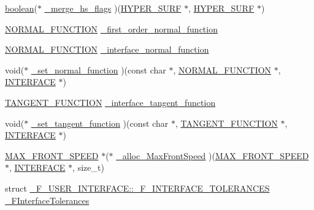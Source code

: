 \begin{DoxyCompactItemize}
\item 
\hyperlink{cdecs_8h_ad048433382a936258fb49e2ec4f148e1}{boolean}($\ast$ \hyperlink{struct___f___u_s_e_r___i_n_t_e_r_f_a_c_e_ab08945a66d48df7977c6a1df5259df87}{\+\_\+merge\+\_\+hs\+\_\+flags} )(\hyperlink{int_8h_acef50fa4757ce0d3f75c97fab5a175bc}{H\+Y\+P\+E\+R\+\_\+\+S\+U\+RF} $\ast$, \hyperlink{int_8h_acef50fa4757ce0d3f75c97fab5a175bc}{H\+Y\+P\+E\+R\+\_\+\+S\+U\+RF} $\ast$)
\item 
\hyperlink{fuserint_8h_a3e3bd260955ac448c42e60e8db22ab36}{N\+O\+R\+M\+A\+L\+\_\+\+F\+U\+N\+C\+T\+I\+ON} \hyperlink{struct___f___u_s_e_r___i_n_t_e_r_f_a_c_e_ac95facb0a29141ebe6db66b39f2b084b}{\+\_\+first\+\_\+order\+\_\+normal\+\_\+function}
\item 
\hyperlink{fuserint_8h_a3e3bd260955ac448c42e60e8db22ab36}{N\+O\+R\+M\+A\+L\+\_\+\+F\+U\+N\+C\+T\+I\+ON} \hyperlink{struct___f___u_s_e_r___i_n_t_e_r_f_a_c_e_a7e5792b8584f95cdb2d37c37b3ecfd14}{\+\_\+interface\+\_\+normal\+\_\+function}
\item 
void($\ast$ \hyperlink{struct___f___u_s_e_r___i_n_t_e_r_f_a_c_e_a9a10ba3e49f191e3dbc7526cfa855012}{\+\_\+set\+\_\+normal\+\_\+function} )(const char $\ast$, \hyperlink{fuserint_8h_a3e3bd260955ac448c42e60e8db22ab36}{N\+O\+R\+M\+A\+L\+\_\+\+F\+U\+N\+C\+T\+I\+ON} $\ast$, \hyperlink{int_8h_a58cf562d0d320a608294b7310ea167dc}{I\+N\+T\+E\+R\+F\+A\+CE} $\ast$)
\item 
\hyperlink{fuserint_8h_aea2be6782ccf43066926630ba9874168}{T\+A\+N\+G\+E\+N\+T\+\_\+\+F\+U\+N\+C\+T\+I\+ON} \hyperlink{struct___f___u_s_e_r___i_n_t_e_r_f_a_c_e_a1c1f44370b3d1cd981b72ce90a94decb}{\+\_\+interface\+\_\+tangent\+\_\+function}
\item 
void($\ast$ \hyperlink{struct___f___u_s_e_r___i_n_t_e_r_f_a_c_e_a16e5bd8e2ecb0ce752f5348181ee071a}{\+\_\+set\+\_\+tangent\+\_\+function} )(const char $\ast$, \hyperlink{fuserint_8h_aea2be6782ccf43066926630ba9874168}{T\+A\+N\+G\+E\+N\+T\+\_\+\+F\+U\+N\+C\+T\+I\+ON} $\ast$, \hyperlink{int_8h_a58cf562d0d320a608294b7310ea167dc}{I\+N\+T\+E\+R\+F\+A\+CE} $\ast$)
\item 
\hyperlink{fdecs_8h_a39ec3151a24738780422b9334f93efbb}{M\+A\+X\+\_\+\+F\+R\+O\+N\+T\+\_\+\+S\+P\+E\+ED} $\ast$($\ast$ \hyperlink{struct___f___u_s_e_r___i_n_t_e_r_f_a_c_e_aab5bd3e0b0152708531c477b61992c4b}{\+\_\+alloc\+\_\+\+Max\+Front\+Speed} )(\hyperlink{fdecs_8h_a39ec3151a24738780422b9334f93efbb}{M\+A\+X\+\_\+\+F\+R\+O\+N\+T\+\_\+\+S\+P\+E\+ED} $\ast$, \hyperlink{int_8h_a58cf562d0d320a608294b7310ea167dc}{I\+N\+T\+E\+R\+F\+A\+CE} $\ast$, size\+\_\+t)
\item 
struct \hyperlink{struct___f___u_s_e_r___i_n_t_e_r_f_a_c_e_d6/dff/struct___f___u_s_e_r___i_n_t_e_r_f_a_c_e_1_1___f___i_n_t_e_r_f_a_c_e___t_o_l_e_r_a_n_c_e_s}{\+\_\+\+F\+\_\+\+U\+S\+E\+R\+\_\+\+I\+N\+T\+E\+R\+F\+A\+C\+E\+::\+\_\+\+F\+\_\+\+I\+N\+T\+E\+R\+F\+A\+C\+E\+\_\+\+T\+O\+L\+E\+R\+A\+N\+C\+ES} \hyperlink{struct___f___u_s_e_r___i_n_t_e_r_f_a_c_e_a45872f18ce101dbb77c0b48438b94997}{\+\_\+\+F\+Interface\+Tolerances}
\end{DoxyCompactItemize}


